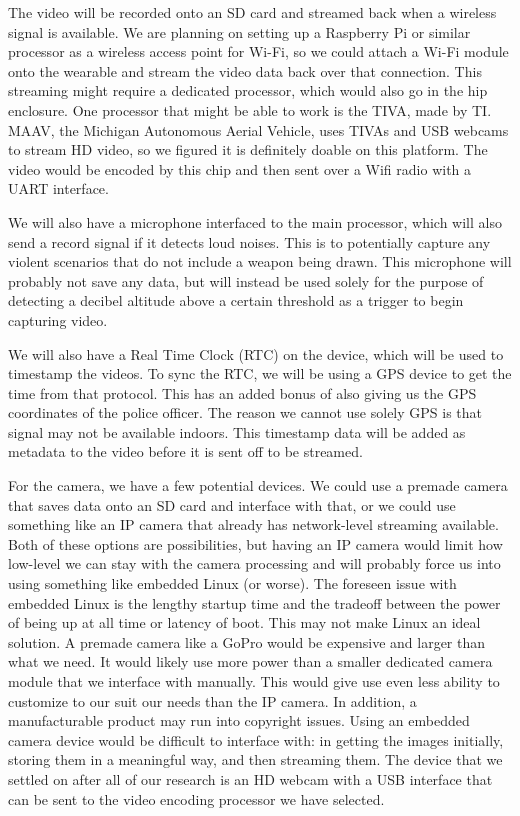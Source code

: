\documentclass[12pt]{article}
\begin{document}
The video will be recorded onto an SD card and streamed back when a wireless
signal is available. We are planning on setting up a Raspberry Pi or similar
processor as a wireless access point for Wi-Fi, so we could attach a Wi-Fi
module onto the wearable and stream the video data back over that connection.
This streaming might require a dedicated processor, which would also go in the
hip enclosure. One processor that might be able to work is the TIVA, made by
TI. MAAV, the Michigan Autonomous Aerial Vehicle, uses TIVAs and USB webcams to
stream HD video, so we figured it is definitely doable on this platform. The
video would be encoded by this chip and then sent over a Wifi radio with a UART
interface.

We will also have a microphone interfaced to the main processor, which will
also send a record signal if it detects loud noises. This is to potentially
capture any violent scenarios that do not include a weapon being drawn. This
microphone will probably not save any data, but will instead be used solely for
the purpose of detecting a decibel altitude above a certain threshold as a
trigger to begin capturing video.

We will also have a Real Time Clock (RTC) on the device, which will be used to
timestamp the videos. To sync the RTC, we will be using a GPS device to get the
time from that protocol. This has an added bonus of also giving us the GPS
coordinates of the police officer. The reason we cannot use solely GPS is that
signal may not be available indoors. This timestamp data will be added as
metadata to the video before it is sent off to be streamed. 

For the camera, we have a few potential devices. We could use a premade camera
that saves data onto an SD card and interface with that, or we could use
something like an IP camera that already has network-level streaming available.
Both of these options are possibilities, but having an IP camera would limit
how low-level we can stay with the camera processing and will probably force us
into using something like embedded Linux (or worse). The foreseen issue with
embedded Linux is the lengthy startup time and the tradeoff between the power
of being up at all time or latency of boot. This may not make Linux an ideal
solution. A premade camera like a GoPro would be expensive and larger than what
we need. It would likely use more power than a smaller dedicated camera module
that we interface with manually. This would give use even less ability to
customize to our suit our needs than the IP camera. In addition, a
manufacturable product may run into copyright issues. Using an embedded camera
device would be difficult to interface with: in getting the images initially,
storing them in a meaningful way, and then streaming them. The device that we
settled on after all of our research is an HD webcam with a USB interface that
can be sent to the video encoding processor we have selected.
\end{document}
